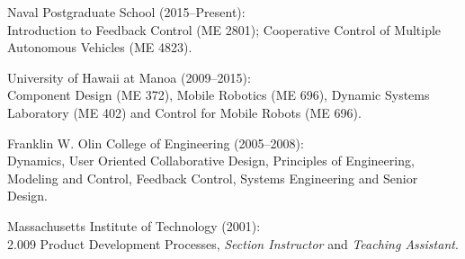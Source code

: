 
\begin{cvitems}
  \item Naval Postgraduate School (2015--Present):\\
        Introduction to Feedback Control (ME 2801); Cooperative Control of Multiple Autonomous Vehicles (ME 4823).
  \item University of Hawaii at Manoa (2009--2015):\\
        Component Design (ME 372), Mobile Robotics (ME 696), Dynamic Systems Laboratory (ME 402) and Control for Mobile Robots (ME 696).
  \item Franklin W. Olin College of Engineering (2005--2008):\\
        Dynamics, User Oriented Collaborative Design, Principles of Engineering, Modeling and Control, Feedback Control, Systems Engineering and Senior Design.
  \item Massachusetts Institute of Technology (2001):\\
        2.009 Product Development Processes, \emph{Section Instructor} and \emph{Teaching Assistant}.
\end{cvitems}
